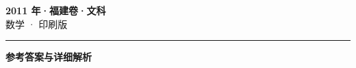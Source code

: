 \documentclass[zihao=5, a4paper]{ctexart}
\begin{document}
\begin{center}
  {\Large\bfseries 2011 年·福建卷·文科}\\[4pt]
  {\large 数学 · 印刷版}
\end{center}
\medskip
{}

\par\bigskip\hrule\bigskip
{}
\begin{center}{\large\bfseries 参考答案与详细解析}\end{center}
\smallskip

\end{document}
